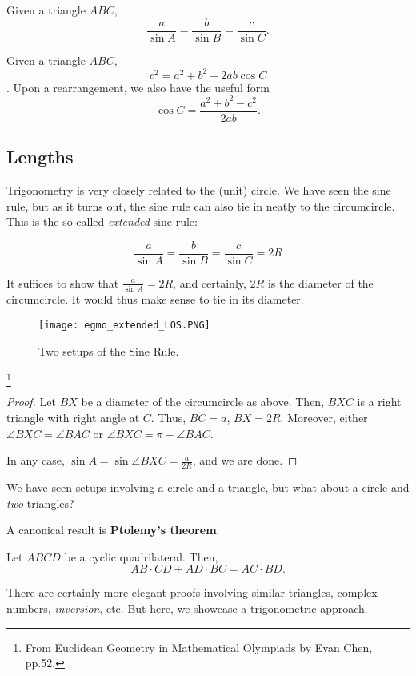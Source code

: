 \documentclass[../jarvis.tex]{subfiles}
\begin{document}
\begin{proposition}
    Given a triangle $ABC$,
    $$\frac{a}{\sin{A}}=\frac{b}{\sin{B}}=\frac{c}{\sin{C}}.$$
\end{proposition}
\begin{proposition}
    Given a triangle $ABC$,
    $$c^2=a^2+b^2-2ab\cos{C}$$.
    Upon a rearrangement, we also have the useful form
    $$\cos{C}=\frac{a^2+b^2-c^2}{2ab}.$$
\end{proposition}
\subsection{Lengths \ez}
Trigonometry is very closely related to the (unit) circle. We have seen the sine rule, but as it turns out, the sine rule can also tie in neatly to the circumcircle. This is the so-called \textit{extended} sine rule:
\begin{proposition}
    $$\frac{a}{\sin{A}}=\frac{b}{\sin{B}}=\frac{c}{\sin{C}}=2R$$
\end{proposition}
It suffices to show that $\frac{a}{\sin{A}}=2R$, and certainly, $2R$ is the diameter of the circumcircle. It would thus make sense to tie in its diameter.
\begin{figure}[H]
    \centering
    \texttt{[image: egmo\_extended\_LOS.PNG]}
    \caption{Two setups of the Sine Rule. \protect\footnotemark}
\end{figure}
\footnote{From Euclidean Geometry in Mathematical Olympiads by Evan Chen, pp.52.}

\begin{proof}
    Let $BX$ be a diameter of the circumcircle as above. Then, $BXC$ is a right triangle with right angle at $C$. Thus, $BC=a$, $BX=2R$. Moreover, either $\angle BXC=\angle BAC$ or $\angle BXC=\pi-\angle BAC$.
    
    In any case, $\sin{A}=\sin{\angle BXC}=\frac{a}{2R}$, and we are done.
\end{proof}

We have seen setups involving a circle and a triangle, but what about a circle and \textit{two} triangles?

A canonical result is \textbf{Ptolemy's theorem}.
\begin{theorem}
    Let $ABCD$ be a cyclic quadrilateral. Then,
    $$AB\cdot CD+AD\cdot BC=AC\cdot BD.$$
\end{theorem}
There are certainly more elegant proofs involving similar triangles, complex numbers, \textit{inversion}, etc. But here, we showcase a trigonometric approach.
\end{document}
